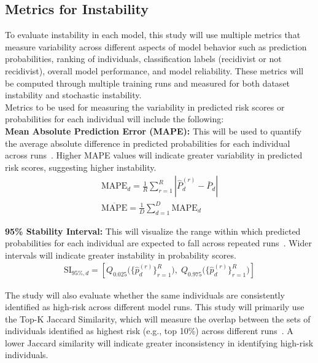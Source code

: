 \documentclass{article}
\begin{document}
\subsection{Metrics for Instability}
To evaluate instability in each model, this study will use multiple metrics that measure variability across different aspects of model behavior such as prediction probabilities, ranking of individuals, classification labels (recidivist or not recidivist), overall model performance, and model reliability. These metrics will be computed through multiple training runs and measured for both dataset instability and stochastic instability.\\

Metrics to be used for measuring the variability in predicted risk scores or probabilities for each individual will include the following: \\
\textbf{Mean Absolute Prediction Error (MAPE):} This will be used to quantify the average absolute difference in predicted probabilities for each individual across runs~\cite{riley2023stability}. Higher MAPE values will indicate greater variability in predicted risk scores, suggesting higher instability. \\

\begin{align}
  \text{MAPE}_d=\frac{1}{R}\sum_{r=1}^{R}|\hat{P}_{d}^{(r)}-\bar{P}_d| \\
  \overline{\text{MAPE}}=\frac{1}{D}\sum_{d=1}^{D}\text{MAPE}_d
\end{align} 

\textbf{95\% Stability Interval:} This will visualize the range within which predicted probabilities for each individual are expected to fall across repeated runs~\cite{riley2023stability}. Wider intervals will indicate greater instability in probability scores.\\

\begin{align}
  \text{SI}_{95\%,d} =
  \left[
  Q_{0.025}\big(\{\hat{p}_d^{(r)}\}_{r=1}^{R}\big),
  \;
  Q_{0.975}\big(\{\hat{p}_d^{(r)}\}_{r=1}^{R}\big)
  \right]
\end{align}  

The study will also evaluate whether the same individuals are consistently identified as high-risk across different model runs. This study will primarily use the Top-K Jaccard Similarity, which will measure the overlap between the sets of individuals identified as highest risk (e.g., top 10\%) across different runs~\cite{lopez2022instability}. A lower Jaccard similarity will indicate greater inconsistency in identifying high-risk individuals.\\
\end{document}

